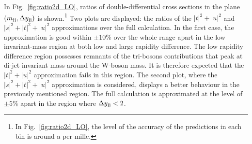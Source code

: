 In Fig.~\ref{fig:ratio2d_LO}, ratios of double-differential cross sections in the plane $\left(m_{\text{j}\text{j}}, \Delta y_{\text{j}\text{j}}\right)$ is shown.\footnote{In Fig.~\ref{fig:ratio2d_LO}, the level of the accuracy of the predictions in each bin is around a per mille.}
Two plots are displayed: the ratios of the $|t|^2 + |u|^2$ and $|s|^2 + |t|^2 + |u|^2$ approximations over the full calculation.
In the first case, the approximation is good within $\pm10\%$ over the whole range apart in the low invariant-mass region at both low and large rapidity difference.
The low rapidity difference region possesses remnants of the tri-bosons contributions that peak at di-jet invariant mass around the W-boson mass.
It is therefore expected that the $|t|^2 + |u|^2$ approximation fails in this region.
The second plot, where the $|s|^2 + |t|^2 + |u|^2$ approximation is considered, displays a better behaviour in the previously mentioned region.
The full calculation is approximated at the level of $\pm5\%$ apart in the region where $\Delta y_{\text{j}\text{j}} < 2$.

